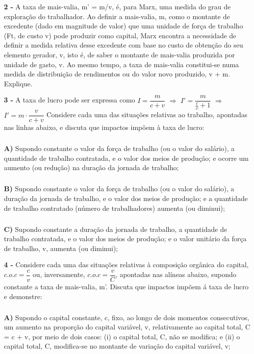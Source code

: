 \documentclass[a4paper, 12pt]{article} %
\begin{document}
\par \textbf{2 -}  A taxa de mais-valia, m’ = m/v, é, para Marx, uma medida do grau de exploração do trabalhador. Ao
definir a mais-valia, m, como o montante de excedente (dado em magnitude de valor) que uma unidade
de força de trabalho (Ft, de custo v) pode produzir como capital, Marx encontra a necessidade de definir
a medida relativa desse excedente com base no custo de obtenção do seu elemento gerador, v, isto é,
de saber o montante de mais-valia produzida por unidade de gasto, v. Ao mesmo tempo, a taxa de mais-valia constitui-se numa medida de distribuição de rendimentos ou do valor novo produzido, v + m.
Explique.

\vspace{0.5cm}

\par \textbf{3 - } A taxa de lucro pode ser expressa como $I = \dfrac{m}{c + v}$ $\Rightarrow$ $I' = \dfrac{m}{\frac{c}{v} + 1}$ $\Rightarrow$ $I' =m \cdot \dfrac{v}{c + v}$  Considere cada
uma das situações relativas ao trabalho, apontadas nas linhas abaixo, e discuta que impactos impõem à taxa de lucro:

\subparagraph{} \textbf{A)} Supondo constante o valor da força de trabalho (ou o valor do salário), a quantidade de
trabalho contratada, e o valor dos meios de produção; e ocorre um aumento (ou redução) na
duração da jornada de trabalho;

\subparagraph{} \textbf{B)} Supondo constante o valor da força de trabalho (ou o valor do salário), a duração da jornada de
trabalho, e o valor dos meios de produção; e a quantidade de trabalho contratado (número de
trabalhadores) aumenta (ou diminui);

\subparagraph{} \textbf{C)} Supondo constante a duração da jornada de trabalho, a quantidade de trabalho contratada, e o
valor dos meios de produção; e o valor unitário da força de trabalho, v, aumenta (ou diminui);

\vspace{0.5cm}

\par \textbf{4 -} Considere cada uma das situações relativas à composição orgânica do capital, $c.o.c = \dfrac{c}{v}$ ou,
inversamente, $c.o.c = \dfrac{v}{C}$, apontadas nas alíneas abaixo, supondo constante a taxa de mais-valia, m’.
Discuta que impactos impõem á taxa de lucro e demonstre:

\subparagraph{} \textbf{A)} Supondo o capital constante, c, fixo, ao longo de dois momentos consecutivos, um aumento na
proporção do capital variável, v, relativamente ao capital total, C = c + v, por meio de dois
casos: (i) o capital total, C, não se modifica; e (ii) o capital total, C, modifica-se no montante de
variação do capital variável, v;
\end{document}
